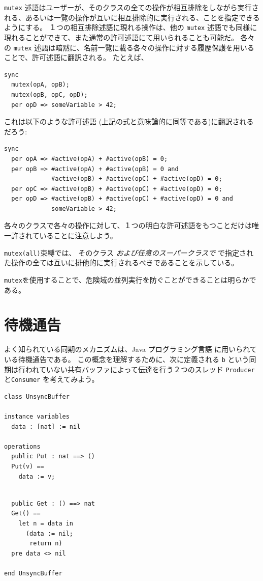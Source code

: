 \documentclass[\pformat,12pt]{jreport}
\begin{document}
\texttt{mutex} 述語はユーザーが、そのクラスの全ての操作が相互排除をしながら実行される、あるいは一覧の操作が互いに相互排除的に実行される、ことを指定できるようにする。
１つの相互排除述語に現れる操作は、他の \texttt{mutex} 述語でも同様に現れることができて、また通常の許可述語にて用いられることも可能だ。
各々の \texttt{mutex} 述語は暗黙に、名前一覧に載る各々の操作に対する履歴保護を用いることで、許可述語に翻訳される。
たとえば、

\begin{lstlisting}
sync
  mutex(opA, opB);
  mutex(opB, opC, opD);
  per opD => someVariable > 42;
\end{lstlisting}

これは以下のような許可述語 (上記の式と意味論的に同等である)に翻訳されるだろう:

\begin{lstlisting}
sync
  per opA => #active(opA) + #active(opB) = 0;
  per opB => #active(opA) + #active(opB) = 0 and
             #active(opB) + #active(opC) + #active(opD) = 0;
  per opC => #active(opB) + #active(opC) + #active(opD) = 0;
  per opD => #active(opB) + #active(opC) + #active(opD) = 0 and
             someVariable > 42;
\end{lstlisting}

各々のクラスで各々の操作に対して、１つの明白な許可述語をもつことだけは唯一許されていることに注意しよう。

\texttt{mutex(all)}束縛では、 そのクラス \emph{および任意のスーパークラスで} で指定された操作の全ては互いに排他的に実行されるべきであることを示している。

\texttt{mutex}を使用することで、危険域の並列実行を防ぐことができることは明らかである。

\section{待機通告}\label{sec:waitnotify}

よく知られている同期のメカニズムは、Java プログラミング言語 \cite{Gosling&00}に用いられている待機通告である。
この概念を理解するために、次に定義される \texttt{b} という同期は行われていない共有バッファによって伝達を行う２つのスレッド \texttt{Producer} と\texttt{Consumer} を考えてみよう。

\begin{multicols}{2}
\begin{lstlisting}
class UnsyncBuffer

instance variables
  data : [nat] := nil

operations
  public Put : nat ==> ()
  Put(v) ==
    data := v;
\end{lstlisting}
\begin{lstlisting}

  public Get : () ==> nat
  Get() ==
    let n = data in
      (data := nil;
       return n)
  pre data <> nil

end UnsyncBuffer
\end{lstlisting}
\end{multicols}
\end{document}
